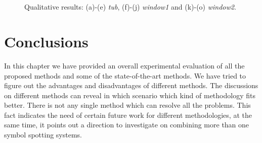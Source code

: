\begin{sidewaysfigure}[th]
\begin{center}
\hspace{0.1cm}
\hspace{0.1cm}
\hspace{0.1cm}
\hspace{0.1cm}
\\
\hspace{0.1cm}
\hspace{0.1cm}
\hspace{0.1cm}
\hspace{0.1cm}
\\
\hspace{0.1cm}
\hspace{0.1cm}
\hspace{0.1cm}
\hspace{0.1cm}
\caption{Qualitative results: (a)-(e) \emph{tub}, (f)-(j) \emph{window1} and (k)-(o) \emph{window2}.}
\label{sfig:experiments:5}
\end{center}
\end{sidewaysfigure}

\section{Conclusions}
\label{sec:experiments:concl}
In this chapter we have provided an overall experimental evaluation of all the proposed methods and some of the state-of-the-art methods. We have tried to figure out the advantages and disadvantages of different methods. The discussions on different methods can reveal in which scenario which kind of methodology fits better. There is not any single method which can resolve all the problems. This fact indicates the need of certain future work for different methodologies, at the same time, it points out a direction to investigate on combining more than one symbol spotting systems.